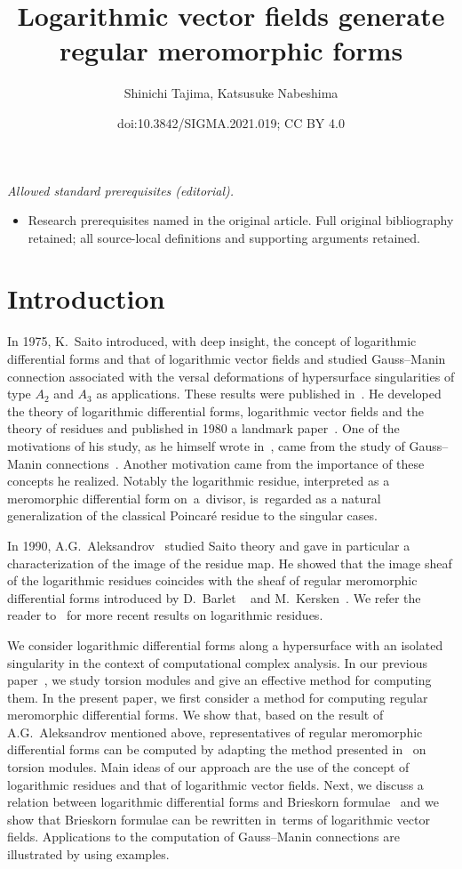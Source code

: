 \documentclass[10pt,a4paper]{amsart}
\title{Logarithmic vector fields generate regular meromorphic forms}
\author{Shinichi Tajima, Katsusuke Nabeshima}
\date{doi:10.3842/SIGMA.2021.019; CC BY 4.0}
\numberwithin{equation}{section}
\begin{document}
\maketitle
\noindent\textit{Allowed standard prerequisites (editorial).}\begin{itemize}
\item Research prerequisites named in the original article. Full original bibliography retained; all source-local definitions and supporting arguments retained.
\end{itemize}\medskip
\section{Introduction}
In 1975, K.~Saito introduced, with deep insight, the concept of logarithmic differential forms and that of logarithmic vector fields and studied Gauss--Manin connection associated with the versal deformations of hypersurface singularities of type $A_2$ and $A_3$ as applications. These results were published in~\cite{S77}. He developed the theory of logarithmic differential forms, logarithmic vector fields and the theory of residues and published in 1980 a landmark paper~\cite{S}. One of the motivations of his study, as he himself wrote in~\cite{S}, came from the study of Gauss--Manin connections~\cite{B,S73}. Another motivation came from the importance of these concepts he realized.
Notably the logarithmic residue, interpreted as a meromorphic differential form on~a~divisor, is~regarded as a natural generalization of the classical Poincar\'e residue to the singular cases.

In 1990, A.G.~Aleksandrov~\cite{A} studied Saito theory and gave in particular a characterization of the image of the residue map. He showed
that the image sheaf of the logarithmic residues coincides with the sheaf of regular meromorphic differential forms introduced by D.~Barlet ~\cite{B} and M.~Kersken~\cite{K83,K84}.
We refer the reader to~\cite{AT,Bru,CM1,CM2,GS,P,P2} for more recent results on logarithmic residues.

We consider logarithmic differential forms along a hypersurface with an isolated singularity in the context of computational complex analysis. In our previous paper~\cite{TN20}, we study torsion modules and give an effective method for computing them.
In the present paper, we first consider a method for computing regular meromorphic differential forms. We show that, based on the result of A.G.~Aleksandrov mentioned above, representatives of regular meromorphic differential forms can be computed by adapting the method presented in~\cite{TN20} on torsion modules. Main ideas of our approach are the use of the concept of logarithmic residues and that of logarithmic vector fields. Next, we discuss a relation between logarithmic differential forms and Brieskorn formulae~\cite{B,Sch,Schu} and we show that Brieskorn formulae can be rewritten in~terms of logarithmic vector fields. Applications to the computation of Gauss--Manin connections are illustrated by using examples.
\end{document}
